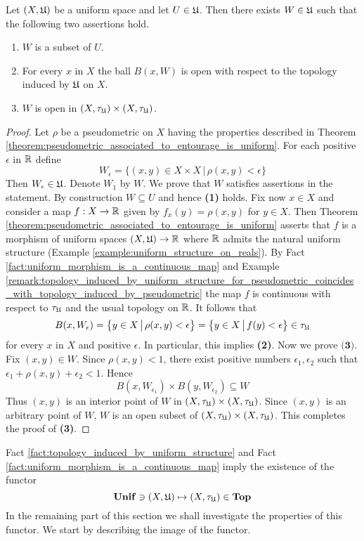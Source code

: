 \begin{theorem}\label{theorem:each_entourage_contains_open_entourage}
Let $(X,{\mathfrak U})$ be a uniform space and let $U \in {\mathfrak U}$. Then there exists $W \in {\mathfrak U}$ such that the following two assertions hold.
\begin{enumerate}[label=\emph{\textbf{(\arabic*)}}, leftmargin=*]
\item $W$ is a subset of $U$.
\item For every $x$ in $X$ the ball $B(x,W)$ is open with respect to the topology induced by ${\mathfrak U}$ on $X$. 
\item $W$ is open in $\left(X,\tau_{{\mathfrak U}}\right)\times \left(X,\tau_{{\mathfrak U}}\right)$.
\end{enumerate}
\end{theorem}
\begin{proof}
Let $\rho$ be a pseudometric on $X$ having the properties described in Theorem \ref{theorem:pseudometric_associated_to_entourage_is_uniform}. For each positive $\epsilon$ in ${\mathbb R}$ define 
$$W_{\epsilon} = \big\{(x,y)\in X\times X\,\big|\,\rho(x,y) < \epsilon\big\}$$
Then $W_{\epsilon} \in {\mathfrak U}$. Denote $W_1$ by $W$. We prove that $W$ satisfies assertions in the statement. By construction $W \subseteq U$ and hence \textbf{(1)} holds. Fix now $x \in X$ and consider a map $f:X\rightarrow {\mathbb R}$ given by $f_x(y) = \rho(x,y)$ for $y\in X$. Then Theorem \ref{theorem:pseudometric_associated_to_entourage_is_uniform} asserts that $f$ is a morphism of uniform spaces $\left(X,{\mathfrak U}\right)\rightarrow {\mathbb R}$ where ${\mathbb R}$ admits the natural uniform structure (Example \ref{example:uniform_structure_on_reals}). By Fact \ref{fact:uniform_morphism_is_a_continuous_map} and Example \ref{remark:topology_induced_by_uniform_structure_for_pseudometric_coincides_with_topology_induced_by_pseudometric} the map $f$ is continuous with respect to $\tau_{{\mathfrak U}}$ and the usual topology on ${\mathbb R}$. It follows that
$$B(x,W_{\epsilon}) = \big\{y\in X\,\big|\,\rho(x,y) < \epsilon\big\} = \big\{y\in X\,\big|\,f(y) < \epsilon\big\}\in \tau_{{\mathfrak U}}$$
for every $x$ in $X$ and positive $\epsilon$. In particular, this implies \textbf{(2)}. Now we prove $\textbf{(3)}$. Fix $(x,y) \in W$. Since $\rho(x,y) < 1$, there exist positive numbers $\epsilon_1,\epsilon_2$ such that $\epsilon_1 + \rho(x,y) + \epsilon_2 < 1$. Hence 
$$B(x,W_{\epsilon_1})\times B(y,W_{\epsilon_2}) \subseteq W$$
Thus $(x,y)$ is an interior point of $W$ in $\left(X,\tau_{{\mathfrak U}}\right)\times \left(X,\tau_{{\mathfrak U}}\right)$. Since $(x,y)$ is an arbitrary point of $W$, $W$ is an open subset of $\left(X,\tau_{{\mathfrak U}}\right)\times \left(X,\tau_{{\mathfrak U}}\right)$. This completes the proof of \textbf{(3)}.
\end{proof}
\noindent
Fact \ref{fact:topology_induced_by_uniform_structure} and Fact \ref{fact:uniform_morphism_is_a_continuous_map} imply the existence of the functor 
$$\mathbf{Unif} \ni (X,{\mathfrak U}) \mapsto (X,\tau_{{\mathfrak U}})\in   \mathbf{Top}$$
In the remaining part of this section we shall investigate the properties of this functor. We start by describing the image of the functor.

